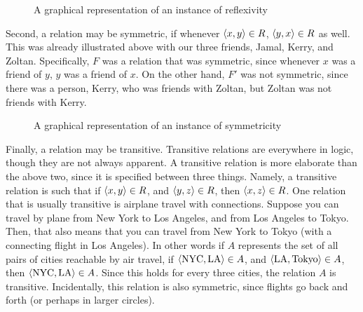 \begin{figure}[h]\centering
{}
\caption{A graphical representation of an instance of reflexivity}
\end{figure}

Second, a relation may be symmetric, if whenever $\langle x, y\rangle \in R$, $\langle y, x\rangle \in R$ as well. This was already illustrated above with our three friends, Jamal, Kerry, and Zoltan. Specifically, $F$ was a relation that was symmetric, since whenever $x$ was a friend of $y$, $y$ was a friend of $x$. On the other hand, $F'$ was not symmetric, since there was a person, Kerry, who was friends with Zoltan, but Zoltan was not friends with Kerry. 

\begin{figure}[h]\centering
{}
\caption{A graphical representation of an instance of symmetricity}
\end{figure}

Finally, a relation may be transitive. Transitive relations are everywhere in logic, though they are not always apparent. A transitive relation is more elaborate than the above two, since it is specified between three things. Namely, a transitive relation is such that if $\langle x, y\rangle \in R$, and $\langle y, z\rangle \in R$, then $\langle x, z\rangle \in R$. One relation that is usually transitive is airplane travel with connections. Suppose you can travel by plane from New York to Los Angeles, and from Los Angeles to Tokyo. Then, that also means that you can travel from New York to Tokyo (with a connecting flight in Los Angeles). In other words if $A$ represents the set of all pairs of cities reachable by air travel, if $\langle\text{NYC}, \text{LA}\rangle \in A$, and $\langle\text{LA}, \text{Tokyo}\rangle \in A$, then $\langle\text{NYC}, \text{LA}\rangle \in A$. Since this holds for every three cities, the relation $A$ is transitive. Incidentally, this relation is also symmetric, since flights go back and forth (or perhaps in larger circles).  

